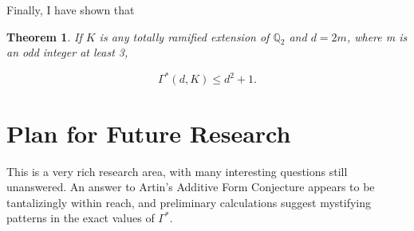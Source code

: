\documentclass{article}
\newtheorem{theorem}{Theorem}
\begin{document}
Finally, I have shown that

\begin{theorem}
If $K$ is any totally ramified extension of $\mathbb{Q}_2$ and $d=2m$, where m is an odd integer at least 3,

$$\Gamma^*(d,K) \le d^2+1.$$
\end{theorem}

\section{Plan for Future Research}

This is a very rich research area, with many interesting questions still unanswered.  An answer to Artin's Additive Form Conjecture appears to be tantalizingly within reach, and preliminary calculations suggest mystifying patterns in the exact values of $\Gamma^*$.



\end{document}
